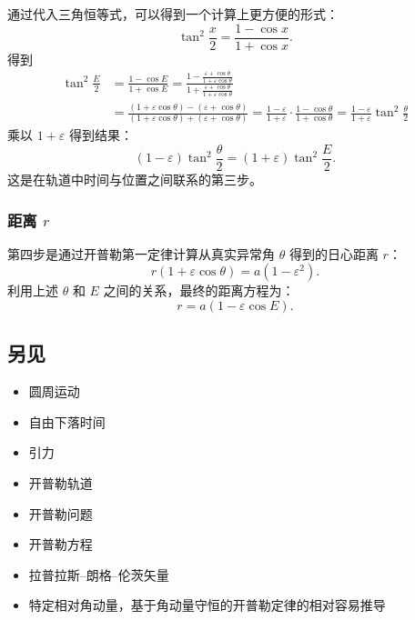 通过代入三角恒等式，可以得到一个计算上更方便的形式：  
\[
\tan^2 \frac{x}{2} = \frac{1 - \cos x}{1 + \cos x}.~
\]
得到  
\begin{align}
\tan^2 \frac{E}{2} &= \frac{1 - \cos E}{1 + \cos E} = \frac{1 - \frac{\varepsilon + \cos \theta}{1 + \varepsilon \cos \theta}}{1 + \frac{\varepsilon + \cos \theta}{1 + \varepsilon \cos \theta}} \\
& = \frac{(1 + \varepsilon \cos \theta) - (\varepsilon + \cos \theta)}{(1 + \varepsilon \cos \theta) + (\varepsilon + \cos \theta)} = \frac{1 - \varepsilon}{1 + \varepsilon} \cdot \frac{1 - \cos \theta}{1 + \cos \theta} = \frac{1 - \varepsilon}{1 + \varepsilon} \tan^2 \frac{\theta}{2} ~
\end{align}
乘以 \(1 + \varepsilon\) 得到结果：  
\[
(1 - \varepsilon) \tan^2 \frac{\theta}{2} = (1 + \varepsilon) \tan^2 \frac{E}{2}.~
\]
这是在轨道中时间与位置之间联系的第三步。
\subsubsection{距离 \(r\)}  
第四步是通过开普勒第一定律计算从真实异常角 \(\theta\) 得到的日心距离 \(r\)：  
\[
r(1 + \varepsilon \cos \theta) = a(1 - \varepsilon^2).~
\]
利用上述 \(\theta\) 和 \(E\) 之间的关系，最终的距离方程为：  
\[
r = a(1 - \varepsilon \cos E).~
\]  
\subsection{另见}  
\begin{itemize}
\item 圆周运动  
\item 自由下落时间  
\item 引力  
\item 开普勒轨道  
\item 开普勒问题  
\item 开普勒方程  
\item 拉普拉斯–朗格–伦茨矢量  
\item 特定相对角动量，基于角动量守恒的开普勒定律的相对容易推导
\end{itemize} 
